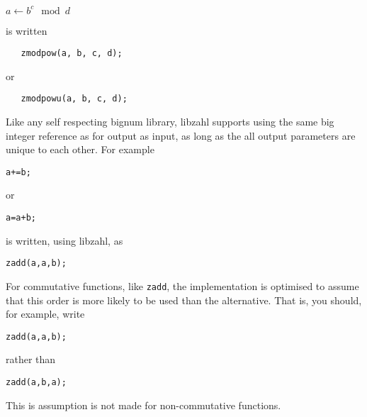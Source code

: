 \vspace{1ex}
$a \gets b^c \mod d$
\vspace{1ex}

\noindent
is written

\begin{verbatim}
   zmodpow(a, b, c, d);
\end{verbatim}

\noindent
or

\begin{verbatim}
   zmodpowu(a, b, c, d);
\end{verbatim}

Like any self respecting bignum library, libzahl
supports using the same big integer reference as
for output as input, as long as the all output
parameters are unique to each other. For example

\begin{alltt}
   a += b;
\end{alltt}

\noindent
or

\begin{alltt}
   a = a + b;
\end{alltt}

\noindent
is written, using libzahl, as

\begin{alltt}
   zadd(a, a, b);
\end{alltt}

For commutative functions, like {\tt zadd}, the
implementation is optimised to assume that this
order is more likely to be used than the alternative.
That is, you should, for example, write

\begin{alltt}
   zadd(a, a, b);
\end{alltt}

\noindent
rather than

\begin{alltt}
   zadd(a, b, a);
\end{alltt}

This is assumption is not made for non-commutative
functions.

